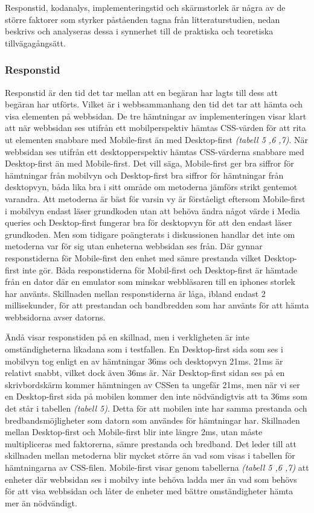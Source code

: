 \documentclass[11pt]{article}
\begin{document}
Responstid, kodanalys, implementeringstid och skärmstorlek är några av de större faktorer som styrker påståenden tagna från litteraturstudien, nedan beskrivs och analyseras dessa i synnerhet till de praktiska och teoretiska tillvägagångsätt.

\subsubsection{Responstid}
Responstid är den tid det tar mellan att en begäran har lagts till dess att begäran har utförts. Vilket är i webbsammanhang den tid det tar att hämta och visa elementen på webbsidan. De tre hämtningar av implementeringen visar klart att när webbsidan ses utifrån ett mobilperspektiv hämtas CSS-värden för att rita ut elementen snabbare med Mobile-first än med Desktop-first \textit{(tabell 5 ,6 ,7)}. När webbsidan ses utifrån ett desktopperspektiv hämtas CSS-värderna snabbare med Desktop-first än med Mobile-first. Det vill säga, Mobile-first ger bra siffror för hämtningar från mobilvyn och Desktop-first bra siffror för hämtningar från desktopvyn, båda lika bra i sitt område om metoderna jämförs strikt gentemot varandra. Att metoderna är bäst för varsin vy är förståeligt eftersom Mobile-first i mobilvyn endast läser grundkoden utan att behöva ändra något värde i Media queries och Desktop-first fungerar bra för desktopvyn för att den endast läser grundkoden. Men som tidigare poängterats i diskussionen handlar det inte om metoderna var för sig utan enheterna webbsidan ses från. Där gynnar responstiderna för Mobile-first den enhet med sämre prestanda vilket Desktop-first inte gör. Båda responstiderna för Mobil-first och Desktop-first är hämtade från en dator där en emulator som minskar webbläsaren till en iphones storlek har använts. Skillnaden mellan responstiderna är låga, ibland endast 2 millisekunder, för att prestandan och bandbredden som har använts för att hämta webbsidorna avser datorns. 

Ändå visar responstiden på en skillnad, men i verkligheten är inte omständigheterna likadana som i testfallen. En Desktop-first sida som ses i mobilvyn tog enligt en av hämtningar 36ms och desktopvyn 21ms. 21ms är relativt snabbt, vilket dock även 36ms är. När Desktop-first sidan ses på en skrivbordskärm kommer hämtningen av CSSen ta ungefär 21ms, men när vi ser en Desktop-first sida på mobilen kommer den inte nödvändigtvis att ta 36ms som det står i tabellen \textit{(tabell 5)}. Detta för att mobilen inte har samma prestanda och bredbandsmöjligheter som datorn som användes för hämtningar har. Skillnaden mellan Desktop-first och Mobile-first blir inte längre 2ms, utan måste multipliceras med faktorerna, sämre prestanda och bredband. Det leder till att skillnaden mellan metoderna blir mycket större än vad som visas i tabellen för hämtningarna av CSS-filen. Mobile-first visar genom tabellerna \textit{(tabell 5 ,6 ,7)} att enheter där webbsidan ses i mobilvy inte behöva ladda mer än vad som behövs för att visa webbsidan och låter de enheter med bättre omständigheter hämta mer än nödvändigt.
\end{document}
